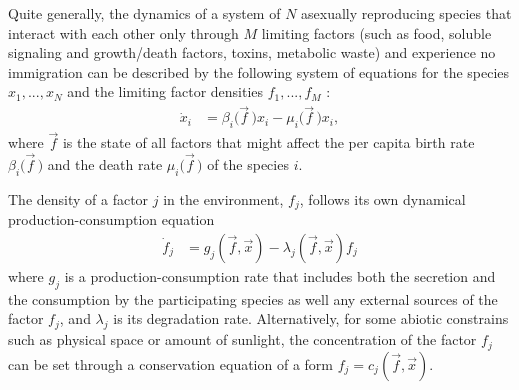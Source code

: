 Quite generally, the dynamics of a system of $N$ asexually reproducing species that interact with each other only through $M$ limiting factors (such as food, soluble signaling and growth/death factors, toxins, metabolic waste) and experience no immigration can be described by the following system of equations for the species $x_1,...,x_N$ and the limiting factor densities $f_1,...,f_M$ \cite{Armstrong1976,McGehee1977a,Armstrong1980}:
\begin{align}
\dot{x}_i &= \beta_i\big(\vec{f}\,\big)x_i - \mu_i\big(\vec{f}\,\big) x_i,
 \label{eq-xi}
\end{align}
where $\vec{f}$ is the state of all factors that might affect the per capita birth rate $\beta_i\big(\vec{f}\,\big)$  and the death rate $\mu_i\big(\vec{f}\,\big)$ of the species $i$.

The density of a factor $j$ in the environment, $f_j$, follows its own dynamical production-consumption equation
\begin{align}
\dot{f}_j &= g_j(\vec{f},\vec{x}) - \lambda_j(\vec{f},\vec{x}) f_j
 \label{eq-fj}
\end{align}
where  $g_j$ is a production-consumption rate that includes both the secretion and the consumption by the participating species as well any external sources of the factor $f_j$, and $\lambda_j$ is its degradation rate. Alternatively, for some abiotic constrains such as physical space or amount of sunlight, the concentration of the factor $f_j$ can be set through a conservation equation of a form \cite{McGehee1977a,Armstrong1980} $f_j = c_j(\vec{f},\vec{x})$.

